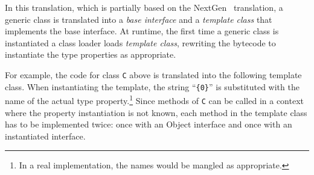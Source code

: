 \documentclass{llncs}
\begin{document}
In this translation, which is partially based on the
NextGen~\cite{allen03,allen04} translation,
a generic class is translated into a \emph{base interface} and
a \emph{template class} that implements the base interface.
At runtime, the first time a generic class is instantiated
a class loader loads \emph{template class}, rewriting the
bytecode to instantiate the type properties as appropriate.

For example, the 
code for class {\tt C} above is translated into the following template class.
When instantiating the template, the string ``{\tt \{0\}}'' is
substituted with the name of the actual type
property.\footnote{In a real implementation, the names would be
mangled as appropriate.}
Since methods of {\tt C} can be called in a context where the
property instantiation is not known, 
each method in the template class has to be implemented twice:
once with an Object interface and once with an instantiated
interface.
\end{document}
